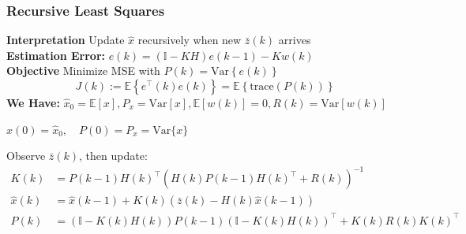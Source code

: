 \subsubsection{Recursive Least Squares}
\textbf{Interpretation} Update $\widehat{x}$ recursively when new $\bar{z}(k)$ arrives\\
\textbf{Estimation Error:} $e(k) = \left( \mathbb{I} - KH \right) e(k-1) - Kw(k)$\\
\textbf{Objective} Minimize MSE with $P(k) = \mathrm{Var} \left\{ e(k) \right\}$
\begin{equation*}
    J(k):= \mathbb{E}\left\{ e^\top(k)e(k) \right\} 
    = \mathbb{E}\left\{ \mathrm{trace}(P(k)) \right\}
\end{equation*}
\textbf{We Have:} $\hat{x}_0 = \mathbb{E}[x], P_x = \text{Var}[x], \mathbb{E}[w(k)]=0, R(k) = \text{Var}[w(k)] $
\begin{description}[leftmargin=0pt]
    \item[Initialization:] $\widehat{x}(0) = \widehat{x}_0, \quad  P(0) = P_x = \mathrm{Var}\{x\}$
    \item[Recursion:] Observe $\bar{z}(k)$, then update:
    \begin{align*}
        K(k) \!&=\! P(k-1)H(k)^\top\left( H(k) P(k-1) H(k)^\top + R(k) \right)^{-1} \\
        \widehat{x}(k) \!&=\! \widehat{x}(k-1) + K(k)
        \left( \bar{z}(k) - H(k) \widehat{x}(k-1) \right) \\
        P(k) \!&=\! \left(\mathbb{I} \!-\! K(k)H(k)\right)\!P(k\!-\!1)\!\left(\mathbb{I} \!-\! K(k)H(k)\right)^\top\!\!\!+\!K(k)R(k)K(k)^\top
    \end{align*}
\end{description}
